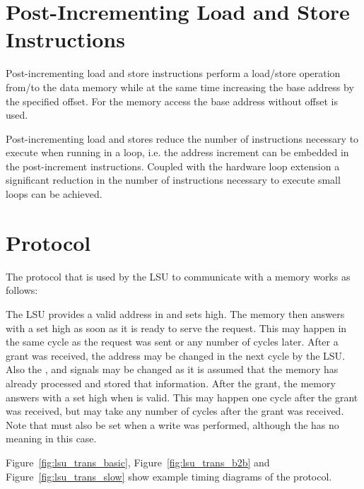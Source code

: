 \section{Post-Incrementing Load and Store Instructions}

Post-incrementing load and store instructions perform a load/store operation
from/to the data memory while at the same time increasing the base address by
the specified offset. For the memory access the base address without offset is
used.

Post-incrementing load and stores reduce the number of instructions necessary to
execute when running in a loop, i.e. the address increment can be embedded in
the post-increment instructions. Coupled with the hardware loop extension a
significant reduction in the number of instructions necessary to execute small
loops can be achieved.


\section{Protocol}
\label{sec:lsu_protocol}

The protocol that is used by the LSU to communicate with a memory works as
follows:

The LSU provides a valid address in  and sets
 high. The memory then answers with a 
set high as soon as it is ready to serve the request. This may happen in the
same cycle as the request was sent or any number of cycles later. After a grant
was received, the address may be changed in the next cycle by the LSU. Also the
,  and  signals
may be changed as it is assumed that the memory has already processed and stored that
information. After the grant, the memory answers with a
 set high when  is valid. This
may happen one cycle after the grant was received, but may take any number of
cycles after the grant was received.
Note that  must also be set when a write was performed,
although the  has no meaning in this case.

Figure~\ref{fig:lsu_trans_basic}, Figure~\ref{fig:lsu_trans_b2b} and
Figure~\ref{fig:lsu_trans_slow} show example timing diagrams of the protocol.

